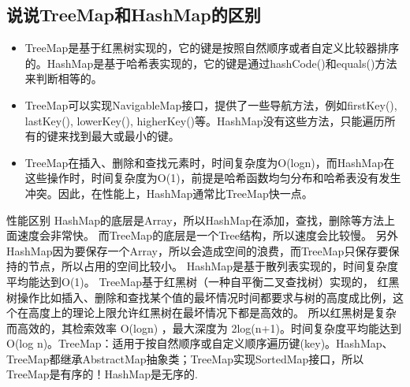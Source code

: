\documentclass[../../../interview-questions.tex]{subfiles}
\begin{document}
\subsection{说说TreeMap和HashMap的区别}

\begin{itemize}
    \item {TreeMap是基于红黑树实现的，它的键是按照自然顺序或者自定义比较器排序的。HashMap是基于哈希表实现的，它的键是通过hashCode()和equals()方法来判断相等的。}
    \item {TreeMap可以实现NavigableMap接口，提供了一些导航方法，例如firstKey(), lastKey(), lowerKey(), higherKey()等。HashMap没有这些方法，只能遍历所有的键来找到最大或最小的键。}
    \item {TreeMap在插入、删除和查找元素时，时间复杂度为O(logn)，而HashMap在这些操作时，时间复杂度为O(1)，前提是哈希函数均匀分布和哈希表没有发生冲突。因此，在性能上，HashMap通常比TreeMap快一点。}
\end{itemize}

性能区别 HashMap的底层是Array，所以HashMap在添加，查找，删除等方法上面速度会非常快。 而TreeMap的底层是一个Tree结构，所以速度会比较慢。 另外HashMap因为要保存一个Array，所以会造成空间的浪费，而TreeMap只保存要保持的节点，所以占用的空间比较小。
HashMap是基于散列表实现的，时间复杂度平均能达到O(1)。 TreeMap基于红黑树（一种自平衡二叉查找树）实现的， 红黑树操作比如插入、删除和查找某个值的最坏情况时间都要求与树的高度成比例，这个在高度上的理论上限允许红黑树在最坏情况下都是高效的。 所以红黑树是复杂而高效的，其检索效率 O(logn) ，最大深度为 2log(n+1)。时间复杂度平均能达到O(log n)。TreeMap：适用于按自然顺序或自定义顺序遍历键(key)。HashMap、TreeMap都继承AbstractMap抽象类；TreeMap实现SortedMap接口，所以TreeMap是有序的！HashMap是无序的.
\end{document}
